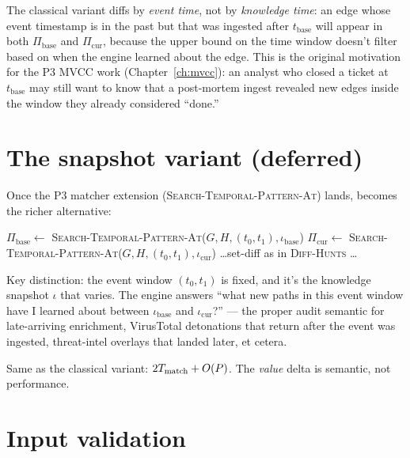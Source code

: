 The classical variant diffs by \emph{event time}, not by
\emph{knowledge time}: an edge whose event timestamp is in the past
but that was ingested after $t_{\text{base}}$ will appear in both
$\Pi_{\text{base}}$ and $\Pi_{\text{cur}}$, because the upper bound
on the time window doesn't filter based on when the engine learned
about the edge. This is the original motivation for the P3 MVCC
work (Chapter~\ref{ch:mvcc}): an analyst who closed a ticket at
$t_{\text{base}}$ may still want to know that a post-mortem ingest
revealed new edges inside the window they already considered
``done.''

\section{The snapshot variant (deferred)}

Once the P3 matcher extension (\textsc{Search-Temporal-Pattern-At})
lands,  becomes the richer alternative:

\begin{algorithm}
\caption{\textsc{Diff-By-Snapshot} (deferred)}\label{alg:diff-snapshot}
$\Pi_{\text{base}} \gets $ \textsc{Search-Temporal-Pattern-At}($G, H, (t_0, t_1), \iota_{\text{base}}$)\;
$\Pi_{\text{cur}} \gets $ \textsc{Search-Temporal-Pattern-At}($G, H, (t_0, t_1), \iota_{\text{cur}}$)\;
\ldots set-diff as in \textsc{Diff-Hunts} \ldots
\end{algorithm}

Key distinction: the event window $(t_0, t_1)$ is fixed, and it's
the knowledge snapshot $\iota$ that varies. The engine answers
``what new paths in this event window have I learned about between
$\iota_{\text{base}}$ and $\iota_{\text{cur}}$?'' --- the proper
audit semantic for late-arriving enrichment, VirusTotal detonations
that return after the event was ingested, threat-intel overlays
that landed later, et cetera.

\begin{complexity}
Same as the classical variant: $2 T_{\text{match}} + O(P)$. The
\emph{value} delta is semantic, not performance.
\end{complexity}

\section{Input validation}

